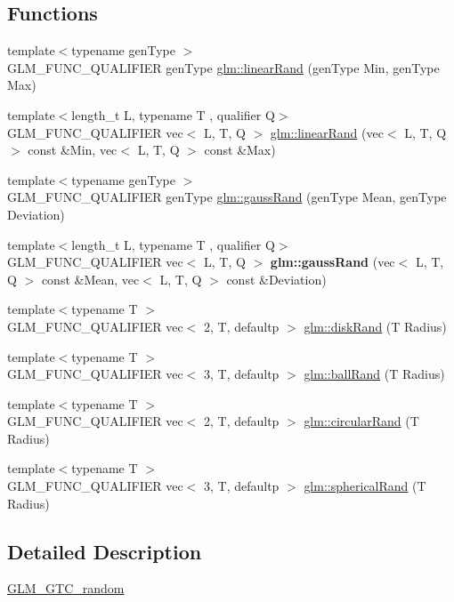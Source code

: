 \subsection*{Functions}
\begin{DoxyCompactItemize}
\item 
{\footnotesize template$<$typename gen\+Type $>$ }\\G\+L\+M\+\_\+\+F\+U\+N\+C\+\_\+\+Q\+U\+A\+L\+I\+F\+I\+ER gen\+Type \hyperlink{group__gtc__random_ga04e241ab88374a477a2c2ceadd2fa03d}{glm\+::linear\+Rand} (gen\+Type Min, gen\+Type Max)
\item 
{\footnotesize template$<$length\+\_\+t L, typename T , qualifier Q$>$ }\\G\+L\+M\+\_\+\+F\+U\+N\+C\+\_\+\+Q\+U\+A\+L\+I\+F\+I\+ER vec$<$ L, T, Q $>$ \hyperlink{group__gtc__random_ga94731130c298a9ff5e5025fdee6d97a0}{glm\+::linear\+Rand} (vec$<$ L, T, Q $>$ const \&Min, vec$<$ L, T, Q $>$ const \&Max)
\item 
{\footnotesize template$<$typename gen\+Type $>$ }\\G\+L\+M\+\_\+\+F\+U\+N\+C\+\_\+\+Q\+U\+A\+L\+I\+F\+I\+ER gen\+Type \hyperlink{group__gtc__random_ga5193a83e49e4fdc5652c084711083574}{glm\+::gauss\+Rand} (gen\+Type Mean, gen\+Type Deviation)
\item 
\mbox{\label{random_8inl_a6335eb662ef1aad00727b8dea15adb0e}} 
{\footnotesize template$<$length\+\_\+t L, typename T , qualifier Q$>$ }\\G\+L\+M\+\_\+\+F\+U\+N\+C\+\_\+\+Q\+U\+A\+L\+I\+F\+I\+ER vec$<$ L, T, Q $>$ {\bfseries glm\+::gauss\+Rand} (vec$<$ L, T, Q $>$ const \&Mean, vec$<$ L, T, Q $>$ const \&Deviation)
\item 
{\footnotesize template$<$typename T $>$ }\\G\+L\+M\+\_\+\+F\+U\+N\+C\+\_\+\+Q\+U\+A\+L\+I\+F\+I\+ER vec$<$ 2, T, defaultp $>$ \hyperlink{group__gtc__random_gaa0b18071f3f97dbf8bcf6f53c6fe5f73}{glm\+::disk\+Rand} (T Radius)
\item 
{\footnotesize template$<$typename T $>$ }\\G\+L\+M\+\_\+\+F\+U\+N\+C\+\_\+\+Q\+U\+A\+L\+I\+F\+I\+ER vec$<$ 3, T, defaultp $>$ \hyperlink{group__gtc__random_ga7c53b7797f3147af68a11c767679fa3f}{glm\+::ball\+Rand} (T Radius)
\item 
{\footnotesize template$<$typename T $>$ }\\G\+L\+M\+\_\+\+F\+U\+N\+C\+\_\+\+Q\+U\+A\+L\+I\+F\+I\+ER vec$<$ 2, T, defaultp $>$ \hyperlink{group__gtc__random_ga9dd05c36025088fae25b97c869e88517}{glm\+::circular\+Rand} (T Radius)
\item 
{\footnotesize template$<$typename T $>$ }\\G\+L\+M\+\_\+\+F\+U\+N\+C\+\_\+\+Q\+U\+A\+L\+I\+F\+I\+ER vec$<$ 3, T, defaultp $>$ \hyperlink{group__gtc__random_ga22f90fcaccdf001c516ca90f6428e138}{glm\+::spherical\+Rand} (T Radius)
\end{DoxyCompactItemize}


\subsection{Detailed Description}
\hyperlink{group__gtc__random}{G\+L\+M\+\_\+\+G\+T\+C\+\_\+random} 